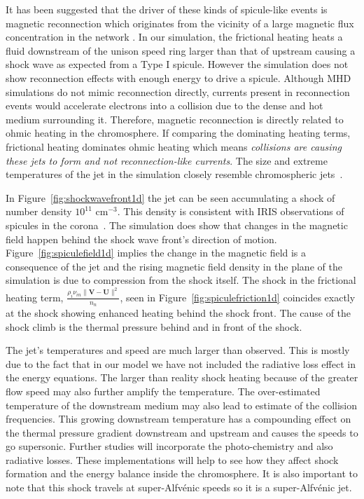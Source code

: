 \documentclass[12pt,upcase]{umlthesis}
\begin{document}
It has been suggested that the driver of these kinds of spicule-like events is magnetic reconnection which originates from the vicinity of a large magnetic flux concentration in the network \citep{Pontieu2007}. In our simulation, the frictional heating heats a fluid downstream of the unison speed ring larger than that of upstream causing a shock wave as expected from a Type I spicule. However the simulation does not show reconnection effects with enough energy to drive a spicule. Although MHD simulations do not mimic reconnection directly, currents present in reconnection events would accelerate electrons into a collision due to the dense and hot medium surrounding it. Therefore, magnetic reconnection is directly related to ohmic heating in the chromosphere. If comparing the dominating heating terms, frictional heating dominates ohmic heating which means {\it collisions are causing these jets to form and not reconnection-like currents}. The size and extreme temperatures of the jet in the simulation closely resemble chromospheric jets~\citep{Shimojo2000,Nishizuka2011}.

In Figure~\ref{fig:shockwavefront1d} the jet can be seen accumulating a shock of number density $10^{11}$ cm$^{-3}$. This density is consistent with IRIS observations of spicules in the corona~\citep{Alissandrakis2018}. The simulation does show that changes in the magnetic field happen behind the shock wave front's direction of motion. Figure~\ref{fig:spiculefield1d} implies the change in the magnetic field is a consequence of the jet and the rising magnetic field density in the plane of the simulation is due to compression from the shock itself. The shock in the frictional heating term, $\frac{\rho_i \nu_{in} \| \textbf{V} - \textbf{U} \|^2}{n_n}$, seen in Figure~\ref{fig:spiculefriction1d} coincides exactly at the shock showing enhanced heating behind the shock front. The cause of the shock climb is the thermal pressure behind and in front of the shock.

The jet's temperatures and speed are much larger than observed. This is mostly due to the fact that in our model we have not included the radiative loss effect in the energy equations. The larger than reality shock heating because of the greater flow speed may also further amplify the temperature. The over-estimated temperature of the downstream medium may also lead to estimate of the collision frequencies. This growing downstream temperature has a compounding effect on the thermal pressure gradient downstream and upstream and causes the speeds to go supersonic. Further studies will incorporate the photo-chemistry and also radiative losses. These implementations will help to see how they affect shock formation and the energy balance inside the chromosphere. It is also important to note that this shock travels at super-Alfv\'enic speeds so it is a super-Alfv\'enic jet.
\end{document}
